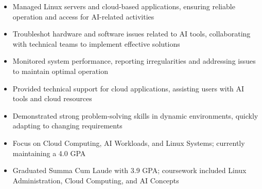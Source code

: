 \par\smallskip
\noindent
\begin{minipage}{20cm}
  \begin{minipage}{9.75cm}
    \begin{itemize}
      \item Managed Linux servers and cloud-based applications, ensuring reliable operation and access for AI-related activities
      \item Troubleshot hardware and software issues related to AI tools, collaborating with technical teams to implement effective solutions
      \item Monitored system performance, reporting irregularities and addressing issues to maintain optimal operation
    \end{itemize}
  \end{minipage}
  \hfill
  \begin{minipage}{9.75cm}
    \begin{itemize}
      \item Provided technical support for cloud applications, assisting users with AI tools and cloud resources
      \item Demonstrated strong problem-solving skills in dynamic environments, quickly adapting to changing requirements
    \end{itemize}
  \end{minipage}
\end{minipage}

\begin{itemize}
  \item Focus on Cloud Computing, AI Workloads, and Linux Systems; currently maintaining a 4.0 GPA
\end{itemize}
\divider

\begin{itemize}
  \item Graduated Summa Cum Laude with 3.9 GPA; coursework included Linux Administration, Cloud Computing, and AI Concepts
\end{itemize}

\noindent
\begin{minipage}{20cm}
     
     
    
\end{minipage}


